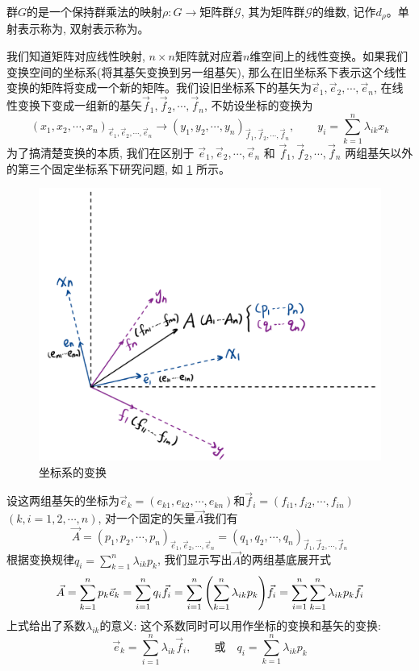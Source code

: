 \begin{definition}[表示]
    群$G$的是一个保持群乘法的映射$\rho:G\to\text{矩阵群$\mathcal{G}$}$, 其为矩阵群$\mathcal{G}$的维数, 记作$d_\rho$。单射表示称为, 双射表示称为。
\end{definition}
\par 我们知道矩阵对应线性映射, $n\times n$矩阵就对应着$n$维空间上的线性变换。如果我们变换空间的坐标系(将其基矢变换到另一组基矢), 那么在旧坐标系下表示这个线性变换的矩阵将变成一个新的矩阵。我们设旧坐标系下的基矢为$\vec{e}_1,\vec{e}_2,\cdots,\vec{e}_n$, 在线性变换下变成一组新的基矢$\vec{f}_1,\vec{f}_2,\cdots,\vec{f}_n$, 不妨设坐标的变换为
$$(x_1,x_2,\cdots,x_n)_{\vec{e}_1,\vec{e}_2,\cdots,\vec{e}_n}\longrightarrow(y_1,y_2,\cdots,y_n)_{\vec{f}_1,\vec{f}_2,\cdots,\vec{f}_n},\qquad y_i=\sum_{k=1}^n\lambda_{ik}x_k$$
为了搞清楚变换的本质, 我们在区别于 \textcolor{03468F}{$\vec{e}_1,\vec{e}_2,\cdots,\vec{e}_n$} 和 \textcolor{82218B}{$\vec{f}_1,\vec{f}_2,\cdots,\vec{f}_n$} 两组基矢以外的第三个固定坐标系下研究问题, 如 \ref{fig:coordinate_transfer} 所示。
\begin{figure}[htbp]
    \centering
    \includegraphics[width=.5\textwidth]{figures/coordinate_transfer.png}
    \caption{坐标系的变换}
    \label{fig:coordinate_transfer}
\end{figure}
设这两组基矢的坐标为$\vec{e}_k=(e_{k1},e_{k2},\cdots,e_{kn})$和$\vec{f}_i=(f_{i1},f_{i2},\cdots,f_{in})$ $(k,i=1,2,\cdots,n)$, 对一个固定的矢量$\vec{A}$我们有
$$\vec{A}=(p_1,p_2,\cdots,p_n)_{\vec{e}_1,\vec{e}_2,\cdots,\vec{e}_n}=(q_1,q_2,\cdots,q_n)_{\vec{f}_1,\vec{f}_2,\cdots,\vec{f}_n}$$
根据变换规律$q_i=\sum_{k=1}^n\lambda_{ik}p_k$, 我们显示写出$\vec{A}$的两组基底展开式
$$\vec{A}=\sum_{k=1}^n p_k\vec{e}_k=\sum_{i=1}^n q_i\vec{f}_i=\sum_{i=1}^n\qty(\sum_{k=1}^n\lambda_{ik}p_k)\vec{f}_i=\sum_{i=1}^n\sum_{k=1}^n\lambda_{ik}p_k\vec{f}_i$$
上式给出了系数$\lambda_{ik}$的意义: 这个系数同时可以用作坐标的变换和基矢的变换:
$$\vec{e}_k=\sum_{i=1}^n\lambda_{ik}\vec{f}_i,\qquad\text{或}\quad q_i=\sum_{k=1}^n\lambda_{ik}p_k$$
